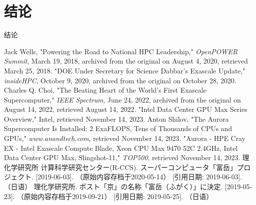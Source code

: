 \documentclass{ctexart}
\begin{document}
\section{结论}
结论
\begin{thebibliography}{99}
Jack Wells, "Powering the Road to National HPC Leadership," \textit{OpenPOWER Summit}, March 19, 2018, archived from the original on August 4, 2020, retrieved March 25, 2018.
"DOE Under Secretary for Science Dabbar's Exascale Update," \textit{insideHPC}, October 9, 2020, archived from the original on October 28, 2020.
Charles Q. Choi, "The Beating Heart of the World's First Exascale Supercomputer," \textit{IEEE Spectrum}, June 24, 2022, archived from the original on August 14, 2022, retrieved August 14, 2022.
"Intel Data Center GPU Max Series Overview," Intel, retrieved November 14, 2023.
Anton Shilov, "The Aurora Supercomputer Is Installed: 2 ExaFLOPS, Tens of Thousands of CPUs and GPUs," \textit{www.anandtech.com}, retrieved November 14, 2023.
"Aurora - HPE Cray EX - Intel Exascale Compute Blade, Xeon CPU Max 9470 52C 2.4GHz, Intel Data Center GPU Max, Slingshot-11," \textit{TOP500}, retrieved November 14, 2023.
理化学研究所 计算科学研究センター(R-CCS). スーパーコンピュータ「富岳」プロジェクト. [2019-06-03]. （原始内容存档于2020-05-14） [引用日期: 2019-06-03]. （日语）
理化学研究所. ポスト「京」の名称「富岳（ふがく）」に決定. [2019-05-23]. （原始内容存档于2019-09-21） [引用日期: 2019-05-25]. （日语）
\end{thebibliography}
\end{document}

